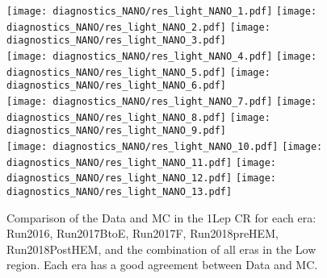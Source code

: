 \begin{figure}[!htb]
	\begin{center}
  \texttt{[image: diagnostics\_NANO/res\_light\_NANO\_1.pdf]}
  \texttt{[image: diagnostics\_NANO/res\_light\_NANO\_2.pdf]} 
  \texttt{[image: diagnostics\_NANO/res\_light\_NANO\_3.pdf]} \\
  \texttt{[image: diagnostics\_NANO/res\_light\_NANO\_4.pdf]}
  \texttt{[image: diagnostics\_NANO/res\_light\_NANO\_5.pdf]} 
  \texttt{[image: diagnostics\_NANO/res\_light\_NANO\_6.pdf]} \\
  \texttt{[image: diagnostics\_NANO/res\_light\_NANO\_7.pdf]}
  \texttt{[image: diagnostics\_NANO/res\_light\_NANO\_8.pdf]} 
  \texttt{[image: diagnostics\_NANO/res\_light\_NANO\_9.pdf]} \\
  \texttt{[image: diagnostics\_NANO/res\_light\_NANO\_10.pdf]}
  \texttt{[image: diagnostics\_NANO/res\_light\_NANO\_11.pdf]} 
  \texttt{[image: diagnostics\_NANO/res\_light\_NANO\_12.pdf]}     
  \texttt{[image: diagnostics\_NANO/res\_light\_NANO\_13.pdf]} \\      
	\end{center}
	\caption{Comparison of the Data and MC in the 1Lep CR for each era: Run2016, Run2017BtoE, Run2017F, Run2018preHEM, Run2018PostHEM, and the combination of all eras in the Low \dm{} region. Each era has a good agreement between Data and MC. 
	 }
	\label{fig:qcd-1lcr-datavsmc-lm-inclusive}
\end{figure}
